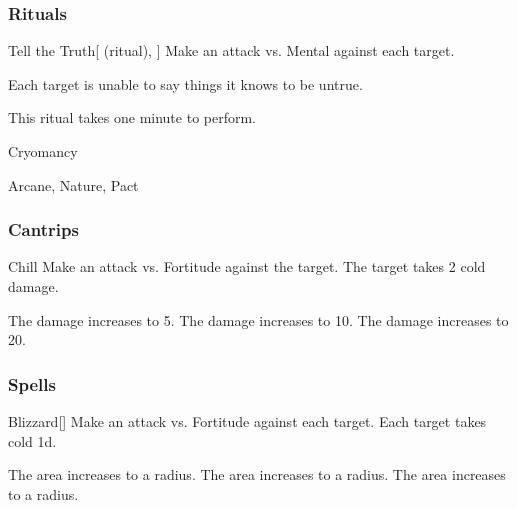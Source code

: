 \subsubsection{Rituals}


\lowercase{\hypertarget{spell:Tell the Truth}{}}\label{spell:Tell the Truth}
\begin{attuneability}[Rank 4]{\hypertarget{spell:Tell the Truth}{Tell the Truth}}[ (ritual), ]
Make an attack vs. Mental against each target.

\hit Each target is unable to say things it knows to be untrue.

This ritual takes one minute to perform.
\end{attuneability}
\vspace{0.25em}


\newpage
\begin{spellsection}{Cryomancy}

\begin{spellheader}
\end{spellheader}


 Arcane, Nature, Pact

\subsubsection{Cantrips}


\begin{freeability}{Chill}
Make an attack vs. Fortitude against the target.
\hit The target takes 2 cold damage.

\rankline
{} The damage increases to 5.
 The damage increases to 10.
 The damage increases to 20.
\end{freeability}

\end{spellsection}


\subsubsection{Spells}


\lowercase{\hypertarget{spell:Blizzard}{}}\label{spell:Blizzard}
\begin{freeability}[Rank 1]{\hypertarget{spell:Blizzard}{Blizzard}}[]
Make an attack vs. Fortitude against each target.
\hit Each target takes cold  \minus1d.

\rankline
{} The area increases to a \areamed radius.
 The area increases to a \arealarge radius.
 The area increases to a \areahuge radius.
\end{freeability}
\vspace{0.25em}




